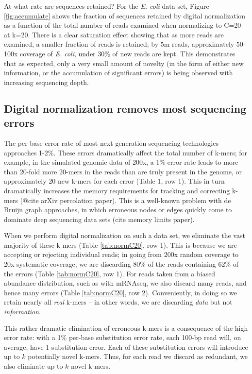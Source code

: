 \documentclass[10pt]{article}
\begin{document}
At what rate are sequences retained?  For the {\em E. coli} data set,
Figure \ref{fig:accumulate} shows the fraction of sequences retained
by digital normalization as a function of the total number of reads
examined when normalizing to C=20 at k=20.  There is a clear
saturation effect showing that as more reads are examined, a smaller
fraction of reads is retained; by 5m reads, approximately 50-100x
coverage of {\em E. coli}, under 30\% of new reads are kept.  This
demonstrates that as expected, only a very small amount of novelty (in
the form of either new information, or the accumulation of significant
errors) is being observed with increasing sequencing depth.


\subsection*{Digital normalization removes most sequencing errors}

The per-base error rate of most next-generation sequencing
technologies approaches 1-2\%.  These errors dramatically affect the
total number of k-mers; for example, in the simulated genomic data of
200x, a 1\% error rate leads to more than 20-fold more 20-mers in the
reads than are truly present in the genome, or approximately 20 new
k-mers for each error (Table 1, row 1).  This in turn dramatically
increases the memory requirements for tracking and correcting k-mers
(@cite arXiv percolation paper).  This is a well-known problem
with de Bruijn graph approaches, in which erroneous nodes or edges quickly
come to dominate deep sequencing data sets (cite memory limits paper).

When we perform digital normalization on such a data set, we eliminate
the vast majority of these k-mers (Table \ref{tab:normC20}, row 1).  This
is because we are accepting or rejecting individual reads; in going
from 200x random coverage to 20x systematic coverage, we are
discarding 80\% of the reads containing 62\% of the errors (Table
\ref{tab:normC20}, row 1).  For reads taken from a biased abundance
distribution, such as with mRNAseq, we also discard many reads, and
hence many errors (Table \ref{tab:normC20}, row 2).  Conveniently, in
doing so we retain nearly all {\em real} k-mers -- in other words, we are
discarding {\em data} but not {\em information}.

This rather dramatic elimination of erroneous k-mers is a consequence
of the high error rate: with a 1\% per-base substitution error rate,
each 100-bp read will, on average, have 1 substitution error. Each of
these substitution errors will introduce up to $k$ potentially novel
k-mers.  Thus, for each read we discard as redundant, we also
eliminate up to $k$ novel k-mers.
\end{document}
